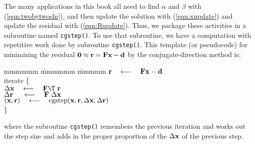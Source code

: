 \par
The many applications in this book all need to
find $\alpha$ and $\beta$ with (\ref{eqn:twobytwosln}), and then
update the solution with (\ref{eqn:xupdate}) and
update the residual with (\ref{eqn:Rupdate}).
Thus, we package these activities in a subroutine
named \texttt{cgstep()}.
To use that subroutine, we have a computation 
with
repetitive work done by subroutine {\tt cgstep()}.
This template (or pseudocode) for minimizing the residual
$\bold 0\approx \bold r = \bold F \bold x - \bold d$
by the conjugate-direction method is:
\label{lsq/'cgtemplate'}
\begin{tabbing}
mmmmmm \= mmmmmm \= mmmmm \kill
\> $\bold r \quad\longleftarrow\quad \bold F \bold x - \bold d$                \\
\> {\rm iterate \{ }                                                    \\
\>      \>  $\Delta \bold x   \padarrow \bold F\T\         \bold r$      \\
\>      \>  $\Delta \bold r\  \quad\longleftarrow\quad \bold F \  \Delta \bold x$      \\
\>      \>  $(\bold x,\bold r) \quad\longleftarrow\quad {\rm cgstep}
             (\bold x,\bold r, \Delta\bold x,\Delta\bold r )$
        \\
\>      \> \}                                           
\end{tabbing}
where
the subroutine {\tt cgstep()}
remembers the previous iteration and
works out the step size and adds in
the proper proportion of the $\Delta \bold x$ of
the previous step.


